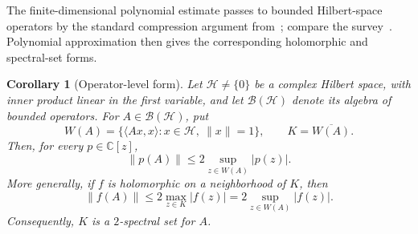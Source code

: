 \documentclass[preprints,article,submit,oneauthor]{Definitions/mdpi}
\newcounter{manuscriptresult}[section]
\theoremstyle{mdpi}
\newtheorem{corollary}[manuscriptresult]{Corollary}
\theoremstyle{definition}
\newcommand{\C}{\mathbb C}
\begin{document}
The finite-dimensional polynomial estimate passes to bounded
Hilbert-space operators by the standard compression argument
from~\cite{Crouzeix2007}; compare the survey~\cite{BickelEtAl2020}.
Polynomial approximation then gives the corresponding holomorphic and
spectral-set forms.

\begin{corollary}[Operator-level form]
\label{cor:operator-bound}
Let $\mathcal H\neq\{0\}$ be a complex Hilbert space, with inner
product linear in the first variable, and let $\mathcal B(\mathcal H)$
denote its algebra of bounded operators.  For
$A\in\mathcal B(\mathcal H)$, put
\[
  W(A)=\{\langle Ax,x\rangle:x\in\mathcal H,\ \lVert x\rVert=1\},
  \qquad K=\overline{W(A)}.
\]
Then, for every $p\in\C[z]$,
\begin{equation}
  \lVert p(A)\rVert
  \leq 2\sup_{z\in W(A)}\lvert p(z)\rvert.
  \label{eq:operator-polynomial-bound}
\end{equation}
More generally, if $f$ is holomorphic on a neighborhood of $K$, then
\begin{equation}
  \lVert f(A)\rVert
  \leq2\max_{z\in K}\lvert f(z)\rvert
  =2\sup_{z\in W(A)}\lvert f(z)\rvert.
  \label{eq:operator-holomorphic-bound}
\end{equation}
Consequently, $K$ is a $2$-spectral set for $A$.
\end{corollary}
\end{document}
